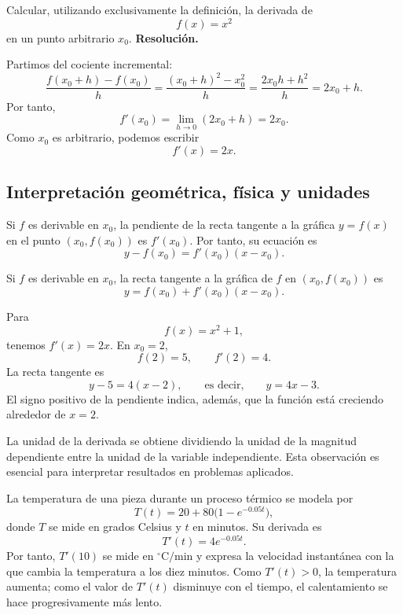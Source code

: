 \begin{solvedexercise}
Calcular, utilizando exclusivamente la definición, la derivada de
\[
f(x)=x^2
\]
en un punto arbitrario $x_0$.
\tcblower
\textbf{Resolución.}\par\smallskip
Partimos del cociente incremental:
\[
\frac{f(x_0+h)-f(x_0)}{h}
=
\frac{(x_0+h)^2-x_0^2}{h}
=
\frac{2x_0h+h^2}{h}
=2x_0+h.
\]
Por tanto,
\[
f'(x_0)=\lim_{h\to0}(2x_0+h)=2x_0.
\]
Como $x_0$ es arbitrario, podemos escribir
\[
f'(x)=2x.
\]
\end{solvedexercise}

\subsection{Interpretación geométrica, física y unidades}

Si $f$ es derivable en $x_0$, la pendiente de la recta tangente a la gráfica $y=f(x)$ en el punto $(x_0,f(x_0))$ es $f'(x_0)$. Por tanto, su ecuación es
\[
y-f(x_0)=f'(x_0)(x-x_0).
\]

\begin{definition}
Si $f$ es derivable en $x_0$, la recta tangente a la gráfica de $f$ en $(x_0,f(x_0))$ es
\[
\boxed{\ y=f(x_0)+f'(x_0)(x-x_0).\ }
\]
\end{definition}

\begin{example}
Para
\[
f(x)=x^2+1,
\]
tenemos $f'(x)=2x$. En $x_0=2$,
\[
f(2)=5,
\qquad
f'(2)=4.
\]
La recta tangente es
\[
y-5=4(x-2),
\qquad\text{es decir,}\qquad
 y=4x-3.
\]
El signo positivo de la pendiente indica, además, que la función está creciendo alrededor de $x=2$.
\end{example}

La unidad de la derivada se obtiene dividiendo la unidad de la magnitud dependiente entre la unidad de la variable independiente. Esta observación es esencial para interpretar resultados en problemas aplicados.

\begin{example}
La temperatura de una pieza durante un proceso térmico se modela por
\[
T(t)=20+80\bigl(1-e^{-0.05t}\bigr),
\]
donde $T$ se mide en grados Celsius y $t$ en minutos. Su derivada es
\[
T'(t)=4e^{-0.05t}.
\]
Por tanto, $T'(10)$ se mide en $^{\circ}\mathrm{C}/\mathrm{min}$ y expresa la velocidad instantánea con la que cambia la temperatura a los diez minutos. Como $T'(t)>0$, la temperatura aumenta; como el valor de $T'(t)$ disminuye con el tiempo, el calentamiento se hace progresivamente más lento.
\end{example}

